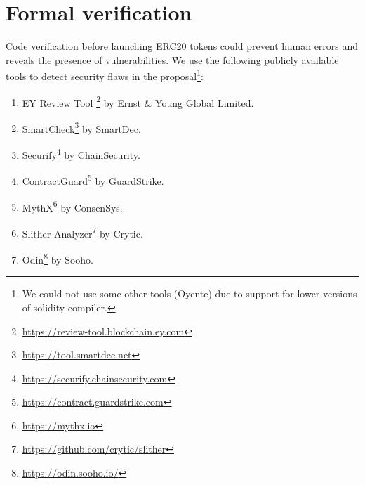 
\section{Formal verification}\label{section:ver}







Code verification before launching ERC20 tokens could prevent human errors and reveals the presence of vulnerabilities. We use the following publicly available tools \cite{AuditTools} to detect security flaws in the proposal\footnote{We could not use some other tools (\eg Oyente) due to support for lower versions of solidity compiler.}:
\begin{enumerate}
	\item EY Review Tool \footnote{\url{https://review-tool.blockchain.ey.com}} by Ernst \& Young Global Limited.
	\item SmartCheck\footnote{\url{https://tool.smartdec.net}} by SmartDec.
	\item Securify\footnote{\url{https://securify.chainsecurity.com}} by ChainSecurity.
	\item ContractGuard\footnote{\url{https://contract.guardstrike.com}} by GuardStrike.
	\item MythX\footnote{\url{https://mythx.io}} by ConsenSys.
	\item Slither Analyzer\footnote{\url{https://github.com/crytic/slither}} by Crytic.
	\item Odin\footnote{\url{https://odin.sooho.io/}} by Sooho.
\end{enumerate}

